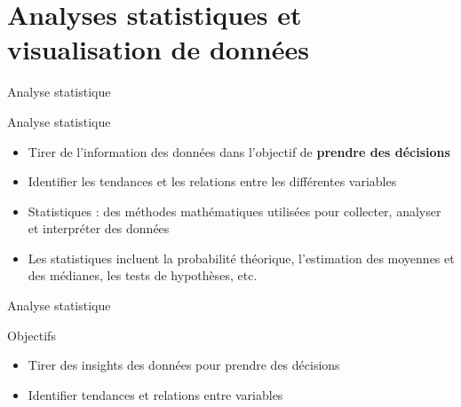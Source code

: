 
\section{Analyses statistiques et \\visualisation de données}



\begin{frame}{Analyse statistique}

  \begin{block}{Analyse statistique}
    \medskip
      \begin{itemize}
        \item<+-> Tirer de l'information des données dans l'objectif de \textbf{prendre des décisions}
        \item<+-> Identifier les tendances et les relations entre les différentes variables
        \item<+-> Statistiques : des méthodes mathématiques utilisées pour collecter, analyser et interpréter des données
        \item<+-> Les statistiques incluent la probabilité théorique, l'estimation des moyennes et des médianes, les tests de hypothèses, etc.
      \end{itemize}
  \end{block}
\end{frame}

\begin{frame}{Analyse statistique}
  \begin{block}{Objectifs}
    \medskip
    \begin{itemize}
      \item<+-> Tirer des insights des données pour prendre des décisions
      \item<+-> Identifier tendances et relations entre variables
    \end{itemize}
  \end{block}


\end{frame}

